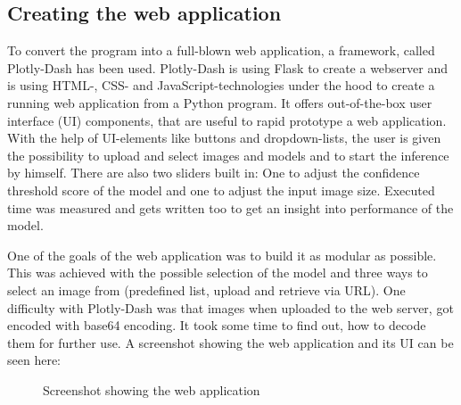 \subsection{Creating the web application}

To convert the program into a full-blown web application, a framework, called Plotly-Dash has been used. Plotly-Dash is using Flask to create a webserver and is using HTML-, CSS- and JavaScript-technologies under the hood to create a running web application from a Python program. It offers out-of-the-box user interface (UI) components, that are useful to rapid prototype a web application. With the help of UI-elements like buttons and dropdown-lists, the user is given the possibility to upload and select images and models and to start the inference by himself. There are also two sliders built in: One to adjust the confidence threshold score of the model and one to adjust the input image size. Executed time was measured and gets written too to get an insight into performance of the model.

One of the goals of the web application was to build it as modular as possible. This was achieved with the possible selection of the model and three ways to select an image from (predefined list, upload and retrieve via URL). One difficulty with Plotly-Dash was that images when uploaded to the web server, got encoded with base64 encoding. It took some time to find out, how to decode them for further use. A screenshot showing the web application and its UI can be seen here:

 \begin{figure}[H]
	\caption{\label{fig:web-app-ui} Screenshot showing the web application}
\end{figure}


